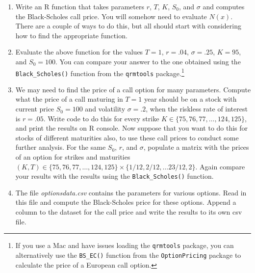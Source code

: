 \documentclass[12pt]{article}
\begin{document}
\begin{enumerate}
\item Write an R function that takes parameters $r$, $T$, $K$,
  $S_0$, and $\sigma$ and computes the Black-Scholes call price. You
  will somehow need to evaluate $N(x)$. There are a couple of ways
  to do this, but all should start with considering how to find the
  appropriate function.
\item Evaluate the above function for the values $T=1$, $r=.04$,
  $\sigma=.25$, $K=95$, and $S_0 = 100$. You can compare your answer
  to the one obtained using the \texttt{Black\_Scholes()} function from 
  the \texttt{qrmtools} package.\footnote{ If you use a Mac and have issues 
  loading the \texttt{qrmtools} package, you can alternatively use the \texttt{BS\_EC()} 
  function from the \texttt{OptionPricing} package to calculate the price of 
  a European call option.} 
\item We may need to find the price of a call option for many parameters.  Compute
  what the price of a call maturing in $T = 1$ year should be on a
  stock with current price $S_0 = 100$ and volatility $\sigma = .2$,
  when the riskless rate of interest is $r = .05$. Write code to do
  this for every strike $K \in \{75, 76, 77, \ldots, 124, 125\}$, and
  print the results on R console.  Now suppose that you want to do
  this for stocks of different maturities also, to
  use these call prices to conduct some further analysis. For the same
  $S_0$, $r$, and $\sigma$, populate a matrix with the prices of an
  option for strikes and maturities $(K,T) \in \{75, 76, 77, \ldots,
  124, 125\} \times \{1/12, 2/12, \ldots 23/12, 2\}$. Again compare
  your results with the results using the \texttt{Black\_Scholes()} function.
\item The file \emph{optionsdata.csv} contains the parameters for various
options. Read in this file and compute the Black-Scholes price for
these options. Append a column to the dataset for the call price and write the results
to its own csv file.
\end{enumerate}
\newpage
 
\end{document}
